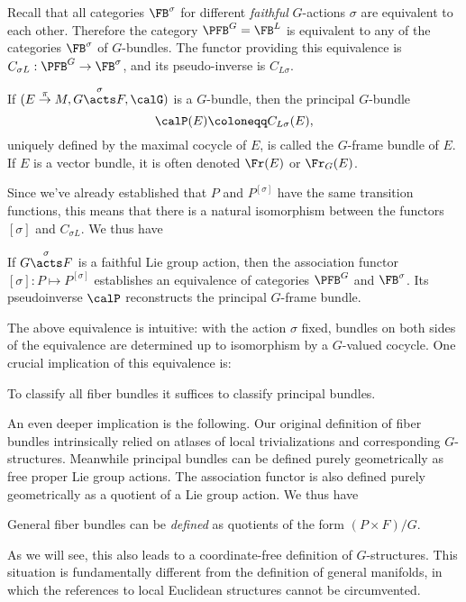 Recall that all categories $\FB^\sigma$ for different \emph{faithful} $G$-actions $\sigma$ are equivalent to each other. Therefore the category $\PFB^G=\FB^L$ is equivalent to any of the categories $\FB^\sigma$ of $G$-bundles. The functor providing this equivalence is $C_{\sigma L}:\PFB^G\to \FB^\sigma$, and its pseudo-inverse is $C_{L\sigma}$. 

\begin{defn}
    If $(E\overset{\pi}{\to}M,G\overset{\sigma}{\acts}F,\calG)$ is a $G$-bundle, then the principal $G$-bundle \[\calP(E)\coloneqq C_{L\sigma}(E),\] uniquely defined by the maximal cocycle of $E$, is called the $G$-frame bundle of $E$. If $E$ is a vector bundle, it is often denoted $\Fr(E)$ or $\Fr_G(E)$.
\end{defn}

Since we've already established that $P$ and $P^{[\sigma]}$ have the same transition functions, this means that there is a natural isomorphism between the functors $[\sigma]$ and $C_{\sigma L}$. We thus have
\begin{prop}
    If $G\overset{\sigma}{\acts}F$ is a faithful Lie group action, then the association functor $[\sigma]:P\mapsto P^{[\sigma]}$ establishes an equivalence of categories $\PFB^G$ and $\FB^\sigma$. Its pseudoinverse $\calP$ reconstructs the principal $G$-frame bundle.
\end{prop}

\begin{rem}
    The above equivalence is intuitive: with the action $\sigma$ fixed, bundles on both sides of the equivalence are determined up to isomorphism by a $G$-valued cocycle. One crucial implication of this equivalence is:
    \begin{center}
        To classify all fiber bundles it suffices to classify principal bundles.
    \end{center}
    An even deeper implication is the following. Our original definition of fiber bundles intrinsically relied on atlases of local trivializations and corresponding $G$-structures. Meanwhile principal bundles can be defined purely geometrically as free proper Lie group actions. The association functor is also defined purely geometrically as a quotient of a Lie group action. We thus have
    \begin{center}
        General fiber bundles can be \emph{defined} as quotients of the form $(P\times F)\slash G$.
    \end{center}
    As we will see, this also leads to a coordinate-free definition of $G$-structures. This situation is fundamentally different from the definition of general manifolds, in which the references to local Euclidean structures cannot be circumvented.
\end{rem}

